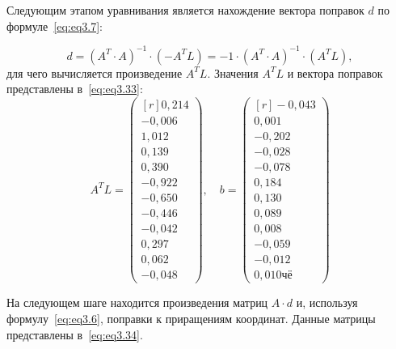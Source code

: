 Следующим этапом уравнивания является нахождение вектора поправок $d$ по формуле~\cref{eq:eq3.7}:

\begin{equation} \label{eq:eq3.7}
	d = (A^T\cdot A)^{-1}\cdot (-A^TL) = -1\cdot (A^T\cdot A)^{-1}\cdot (A^TL),
\end{equation}
 для чего вычисляется произведение $A^TL$. Значения $A^TL$ и вектора поправок представлены в~\cref{eq:eq3.33}:
\begin{equation} \label{eq:eq3.33}	%
 	A^TL = \begin{pmatrix*}[r] 0,214 \\ -0,006 \\ 1,012 \\ 0,139 \\ 0,390 \\ -0,922 \\%
 						  -0,650 \\ -0,446 \\ -0,042 \\ 0,297 \\ 0,062 \\ -0,048 \end{pmatrix*},  \quad%
 	 b = \begin{pmatrix*}[r]   -0,043 \\ 0,001 \\ -0,202 \\ -0,028 \\ -0,078 \\ 0,184 \\%
 	 					   0,130 \\ 0,089 \\ 0,008 \\ -0,059 \\ -0,012 \\ 0,010чё \end{pmatrix*}
\end{equation} 
 
 
 На следующем шаге находится произведения матриц $A\cdot d$ и, используя формулу~\cref{eq:eq3.6}, поправки к приращениям координат. Данные матрицы представлены в~\cref{eq:eq3.34}.
 
